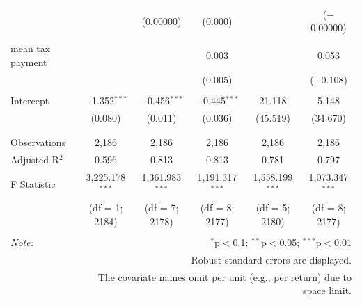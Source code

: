 \documentclass{article}
\begin{document}
\begin{tabular}{@{\extracolsep{.001pt}}lccccc}
  &  & (0.00000) & (0.000) &  & ($-$0.00000) \\ 
  & & & & & \\ 
 mean tax payment &  &  & 0.003 &  & 0.053 \\ 
  &  &  & (0.005) &  & ($-$0.108) \\ 
  & & & & & \\ 
 Intercept & $-$1.352$^{***}$ & $-$0.456$^{***}$ & $-$0.445$^{***}$ & 21.118 & 5.148 \\ 
  & (0.080) & (0.011) & (0.036) & (45.519) & (34.670) \\ 
  & & & & & \\ 
\hline \\[-1.8ex] 
Observations & 2,186 & 2,186 & 2,186 & 2,186 & 2,186 \\ 
Adjusted R$^{2}$ & 0.596 & 0.813 & 0.813 & 0.781 & 0.797 \\ 
F Statistic & 3,225.178$^{***}$  & 1,361.983$^{***}$  & 1,191.317$^{***}$  & 1,558.199$^{***}$  & 1,073.347$^{***}$  \\ 
 & (df = 1; 2184) & (df = 7; 2178) & (df = 8; 2177) & (df = 5; 2180) & (df = 8; 2177) \\
\hline 
\hline \\[-1.8ex] 
\textit{Note:}  & \multicolumn{5}{r}{$^{*}$p$<$0.1; $^{**}$p$<$0.05; $^{***}$p$<$0.01} \\ 
 & \multicolumn{5}{r}{Robust standard errors are displayed.} \\ 
 & \multicolumn{5}{r}{The covariate names omit per unit (e.g., per return) due to space limit.} \\ 
\end{tabular} 
\endgroup 
\end{document}
